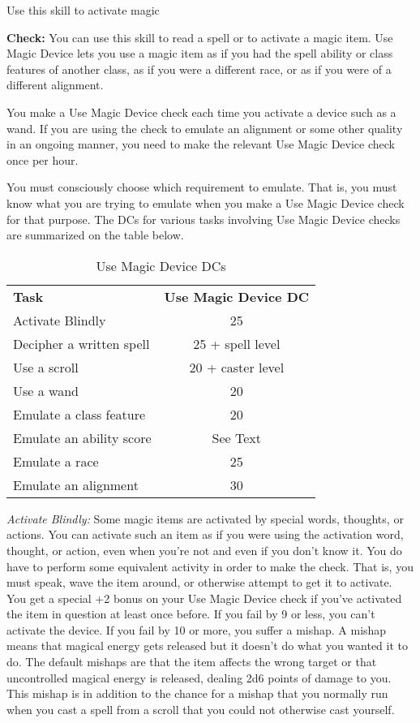 
Use this skill to activate magic

\textbf{Check:} You can use this skill to read a spell or to activate a magic item. 
Use Magic Device lets you use a magic item as if you had the spell ability or class 
features of another class, as if you were a different race, or as if you were of 
a different alignment.

You make a Use Magic Device check each time you activate a device such as a wand. 
If you are using the check to emulate an alignment or some other quality in an 
ongoing manner, you need to make the relevant Use Magic Device check once per hour.

You must consciously choose which requirement to emulate. That is, you must know 
what you are trying to emulate when you make a Use Magic Device check for that 
purpose. The DCs for various tasks involving Use Magic Device checks are summarized 
on the table below.

\begin{table}[htb]
\caption{Use Magic Device DCs}
\centering
\begin{tabular}{l c}
\textbf{Task} & \textbf{Use Magic Device DC}\\
Activate Blindly & 25\\
Decipher a written spell & 25 + spell level\\
Use a scroll & 20 + caster level\\
Use a wand & 20\\
Emulate a class feature & 20\\
Emulate an ability score & See Text\\
Emulate a race & 25\\
Emulate an alignment & 30\\
\end{tabular}
\end{table}

\textit{Activate Blindly:} Some magic items are activated by special words, thoughts, 
or actions. You can activate such an item as if you were using the activation word, 
thought, or action, even when you're not and even if you don't know it. You do 
have to perform some equivalent activity in order to make the check. That is, you 
must speak, wave the item around, or otherwise attempt to get it to activate. You 
get a special +2 bonus on your Use Magic Device check if you've activated the item 
in question at least once before. If you fail by 9 or less, you can't activate 
the device. If you fail by 10 or more, you suffer a mishap. A mishap means that 
magical energy gets released but it doesn't do what you wanted it to do. The default 
mishaps are that the item affects the wrong target or that uncontrolled magical 
energy is released, dealing 2d6 points of damage to you. This mishap is in addition 
to the chance for a mishap that you normally run when you cast a spell from a scroll 
that you could not otherwise cast yourself.

